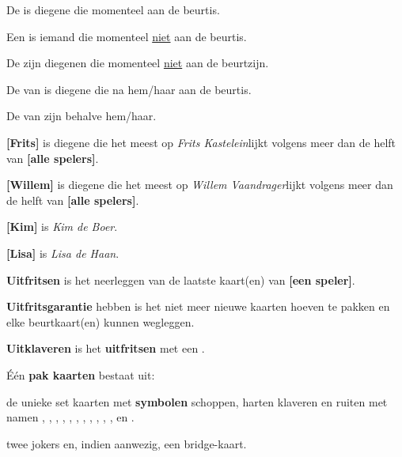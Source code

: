 \item De \huidigeSpeler is diegene die momenteel aan de beurt\footnotemark[1] is.  

\item Een \andereSpeler is iemand die momenteel \ul{niet} aan de beurt\footnotemark[1] is. 

\item De \andereSpelers zijn diegenen die momenteel \ul{niet} aan de beurt\footnotemark[1] zijn. 

\item De \volgendeSpeler van \eenSpeler is diegene die na hem/haar aan de beurt\footnotemark[1] is. 

\item De \medeSpelers van \eenSpeler zijn \alleSpelers behalve hem/haar.

\item \textbf{[Frits]} is diegene die het meest op \textit{Frits Kastelein}\footnotemark[2] lijkt volgens meer dan de helft van \textbf{[alle spelers]\footnotemark[3]}.

\item \textbf{[Willem]} is diegene die het meest op \textit{Willem Vaandrager}\footnotemark[2] lijkt volgens meer dan de helft van \textbf{[alle spelers]\footnotemark[3]}.

\item \label{item:kim}\textbf{[Kim]} is \textit{Kim de Boer}.

\item \label{item:lisa}\textbf{[Lisa]} is \textit{Lisa de Haan}.

\item \label{item:uitfritsen} \textbf{Uitfritsen} is het neerleggen van de laatste kaart(en) van \textbf{[een speler]}.

\item  \label{item:uitfritsgarantie} \textbf{Uitfritsgarantie} hebben is het niet meer nieuwe kaarten hoeven te pakken en elke beurt\footnotemark[1] kaart(en) kunnen wegleggen.

\item \label{item:uitklaver} \textbf{Uitklaveren} is het \textbf{uitfritsen} met een \footnotemark[4].

\item \label{item:kaarten} \'E\'en \textbf{pak kaarten} bestaat uit: 
    \puntLijst{}
        \item de unieke set kaarten met \textbf{symbolen} schoppen, harten klaveren en ruiten met namen , , , , , , , , , , ,  en .
        \item twee jokers en, indien aanwezig, een bridge-kaart.
    \eindPuntLijst{}

